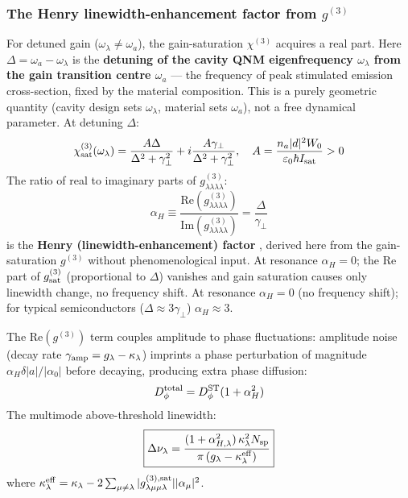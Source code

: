 \documentclass[12pt]{article}
\begin{document}
\subsubsection*{The Henry linewidth-enhancement factor from $g^{(3)}$}

For detuned gain ($\omega_\lambda\neq\omega_a$), the gain-saturation
$\chi^{(3)}$ acquires a real part.  Here $\Delta = \omega_a - \omega_\lambda$
is the \textbf{detuning of the cavity QNM eigenfrequency $\omega_\lambda$
from the gain transition centre $\omega_a$} --- the frequency of peak
stimulated emission cross-section, fixed by the material composition.
This is a purely geometric quantity (cavity design sets $\omega_\lambda$,
material sets $\omega_a$), not a free dynamical parameter.  At detuning $\Delta$:
\begin{equation}
  \chi^{(3)}_{\rm sat}(\omega_\lambda) =
  \frac{A\Delta}{\Delta^2+\gamma_\perp^2}
  +i\frac{A\gamma_\perp}{\Delta^2+\gamma_\perp^2},
  \quad A = \frac{n_a|d|^2W_0}{\varepsilon_0\hbar I_{\rm sat}} > 0
  \label{eq:chi3_detuned}
\end{equation}
The ratio of real to imaginary parts of
$g^{(3)}_{\lambda\lambda\lambda\lambda}$:
\begin{equation}
  \boxed{
  \alpha_H \equiv
  \frac{\mathrm{Re}(g^{(3)}_{\lambda\lambda\lambda\lambda})}
  {\mathrm{Im}(g^{(3)}_{\lambda\lambda\lambda\lambda})}
  = \frac{\Delta}{\gamma_\perp}
  }
  \label{eq:alpha_H}
\end{equation}
is the \textbf{Henry (linewidth-enhancement) factor} \cite{Henry1982},
derived here from the gain-saturation $g^{(3)}$ without phenomenological input.
At resonance $\alpha_H = 0$; the Re part of $g^{(3)}_{\rm sat}$ (proportional
to $\Delta$) vanishes and gain saturation causes only linewidth change, no
frequency shift.
At resonance $\alpha_H = 0$ (no frequency shift); for typical semiconductors ($\Delta\approx
3\gamma_\perp$) $\alpha_H\approx 3$.

The $\mathrm{Re}(g^{(3)})$ term couples amplitude to phase fluctuations:
amplitude noise (decay rate $\gamma_{\rm amp}=g_\lambda-\kappa_\lambda$)
imprints a phase perturbation of magnitude $\alpha_H\delta|a|/|\alpha_0|$
before decaying, producing extra phase diffusion:
\begin{equation}
  D_\phi^{\rm total} = D_\phi^{\rm ST}(1+\alpha_H^2)
  \label{eq:D_phi_Henry}
\end{equation}
The multimode above-threshold linewidth:
\begin{equation}
  \boxed{
  \Delta\nu_\lambda =
  \frac{(1+\alpha_{H,\lambda}^2)\,\kappa_\lambda^2 N_{\rm sp}}
  {\pi\,(g_\lambda - \kappa_\lambda^{\rm eff})}
  }
  \label{eq:multimode_ST}
\end{equation}
where $\kappa_\lambda^{\rm eff} = \kappa_\lambda
- 2\sum_{\mu\neq\lambda}|g^{(3),\rm sat}_{\lambda\mu\mu\lambda}||\alpha_\mu|^2$.
\end{document}
